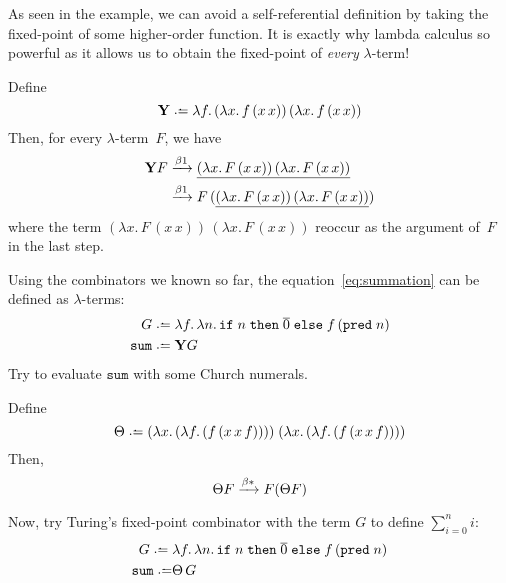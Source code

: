 As seen in the example, we can avoid a self-referential definition by taking the
fixed-point of some higher-order function. It is exactly why lambda calculus so
powerful as it allows us to obtain the fixed-point of \emph{every}
$\lambda$-term!
\begin{proposition}
  Define
  \[
    \mathbf{Y} \defeq
    \lambda f.\, (\lambda x.\, f\,(x\,x))\,(\lambda x.\,f\,(x\,x))
  \]
  Then, for every $\lambda$-term~$F$, we have
  \begin{align*}
    \mathbf{Y}F
    & \xrightarrow{\beta1} \underline{(\lambda x.\,F\,(x\,x))\,(\lambda x.\, F\,(x\,x))} \\
    & \xrightarrow{\beta1} F\,(\underline{(\lambda x.\,F\,(x\,x))\,(\lambda x.\,
      F\,(x\,x))})
  \end{align*}
  where the term $(\lambda x.\,F\,(x\,x))\,(\lambda x.\, F\,(x\,x))$
  reoccur as the argument of~$F$ in the last step.
\end{proposition}
\begin{example}
  Using the combinators we known so far, the equation~\eqref{eq:summation}
  can be defined as $\lambda$-terms:
  \begin{align*}
    G \defeq{} &
    \lambda f.\,\lambda n.\,
    \mathtt{if}\;n\;\mathtt{then}\;\overline{0}\;\mathtt{else}\;
    f\,(\mathtt{pred}\;n) \\
    \mathtt{sum} \defeq{} & \mathbf{Y}G
  \end{align*}
  Try to evaluate $\mathtt{sum}$ with some Church numerals.
\end{example}

\begin{proposition}
  Define 
  \[
    \Theta \defeq 
    (\lambda x.\,(\lambda f.\,(f\,(x\,x\,f))))\;
    (\lambda x.\,(\lambda f.\,(f\,(x\,x\,f))))
  \]
  Then, 
  \[
    \Theta F \xrightarrow{\beta*} F (\Theta F)
  \]
\end{proposition}
\begin{example}
  Now, try Turing's fixed-point combinator with the term $G$ to define
  $\sum_{i=0}^n i$:
  \begin{align*}
    G \defeq{} &
    \lambda f.\,\lambda n.\,
    \mathtt{if}\;n\;\mathtt{then}\;\overline{0}\;\mathtt{else}\;
    f\,(\mathtt{pred}\;n) \\
    \mathtt{sum} \defeq & \Theta\,G \\
  \end{align*}
\end{example}

